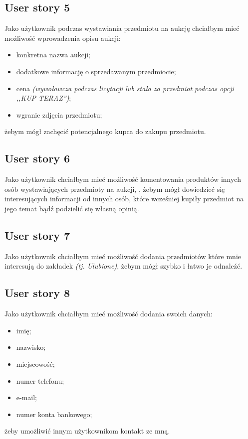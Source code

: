 \documentclass[a4paper]{article}
\begin{document}
	\subsection{User story 5}
	Jako użytkownik podczas wystawiania przedmiotu na aukcję chciałbym mieć możliwość wprowadzenia opisu aukcji:
	\begin{itemize}
		\item konkretna nazwa aukcji;
		\item dodatkowe informację o sprzedawanym przedmiocie;
		\item cena \emph{(wywoławcza podczas licytacji lub stała za przedmiot podczas opcji ,,KUP TERAZ'')};
		\item wgranie zdjęcia przedmiotu;
	\end{itemize}
	żebym mógł zachęcić potencjalnego kupca do zakupu przedmiotu.
	
	\subsection{User story 6}
	Jako użytkownik chciałbym mieć możliwość komentowania produktów innych osób wystawiających przedmioty na aukcji, , żebym mógł dowiedzieć się interesujących informacji od innych osób, które wcześniej kupiły przedmiot na jego temat bądź podzielić się własną opinią.
	
	\subsection{User story 7}
	Jako użytkownik chciałbym mieć możliwość dodania przedmiotów które mnie interesują do zakładek \emph{ (tj. Ulubione)}, żebym mógł szybko i łatwo je odnaleźć. 
	
	\subsection{User story 8}
	Jako użytkownik chciałbym mieć możliwość dodania swoich danych:
	\begin{itemize}
		\item imię;
		\item nazwisko;
		\item miejscowość;
		\item numer telefonu;
		\item e-mail;
		\item numer konta bankowego;
	\end{itemize}
	żeby umożliwić innym użytkownikom kontakt ze mną.
	
\end{document}
